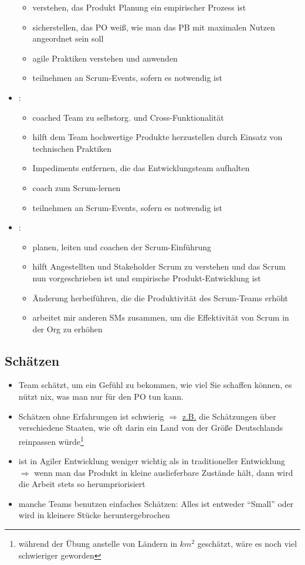 \begin{itemize}
\begin{itemize}
      \item verstehen, das Produkt Planung ein empirischer Prozess ist
      \item sicherstellen, das PO weiß, wie man das PB mit maximalen Nutzen angeordnet sein soll
      \item agile Praktiken verstehen und anwenden
      \item teilnehmen an Scrum-Events, sofern es notwendig ist
    \end{itemize}
  \item {}:
    \begin{itemize}
      \item coached Team zu selbstorg. und Cross-Funktionalität
      \item hilft dem Team hochwertige Produkte herzustellen durch Einsatz von technischen Praktiken
      \item Impediments entfernen, die das Entwicklungsteam aufhalten
      \item coach zum Scrum-lernen
      \item teilnehmen an Scrum-Events, sofern es notwendig ist
    \end{itemize}
  \item {}:
    \begin{itemize}
      \item planen, leiten und coachen der Scrum-Einführung
      \item hilft Angestellten und Stakeholder Scrum zu verstehen und das Scrum nun
        vorgeschrieben ist und empirische Produkt-Entwicklung ist
      \item Änderung herbeiführen, die die Produktivität des Scrum-Teams erhöht
      \item arbeitet mir anderen SMs zusammen, um die Effektivität von Scrum in der Org zu
        erhöhen
    \end{itemize}
\end{itemize}


\subsection{Schätzen}
\begin{itemize}
  \item Team schätzt, um ein Gefühl zu bekommen, wie viel Sie schaffen können, es nützt nix, was man
    nur für den PO tun kann.
  \item  Schätzen ohne Erfahrungen ist schwierig $\Rightarrow$  \uline{z.B.} die Schätzungen
    über verschiedene Staaten, wie oft darin ein Land von der Größe Deutschlands reinpassen
    würde\footnote{während der Übung anstelle von Ländern in $km^2$ geschätzt, wäre es noch
    viel schwieriger geworden}
  \item ist in Agiler Entwicklung weniger wichtig als in traditioneller Entwicklung $\Rightarrow$
    wenn man das Produkt in kleine auslieferbare Zustände hält, dann wird die Arbeit stets so
    herumpriorisiert
  \item manche Teams benutzen einfaches Schätzen: Alles ist entweder \enquote{Small} oder wird in
    kleinere Stücke heruntergebrochen
\end{itemize}


